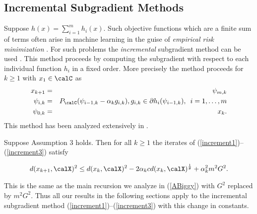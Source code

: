  \subsection{Incremental Subgradient Methods}
 Suppose $h(x)=\sum_{i=1}^m h_i(x)$. Such objective functions which are a finite sum of terms often arise in machine learning in the guise of \emph{empirical risk minimization} \cite{hastie2009elements}. For such problems the \emph{incremental} subgradient method can be used \cite{nedic2001convergence}. This method proceeds by computing the subgradient with respect to each individual function $h_i$ in a fixed order. More precisely the method proceeds for $k\geq 1$ with $x_1\in\calC$ as
 \begin{eqnarray}\label{increment1}
 x_{k+1}&=&\psi_{m,k}
 \\\label{increment2}
 \psi_{i,k}&=& P_\calC(\psi_{i-1,k}-\alpha_k g_{i,k}),g_{i,k}\in\partial h_i(\psi_{i-1,k}),\,\,\, i=1,\ldots,m
 \\\label{increment3}
 \psi_{0,k}&=&x_k.
 \end{eqnarray}
  This method has been analyzed extensively in \cite{nedic2001convergence}.
  \begin{proposition}
Suppose Assumption 3 holds. Then for all $k\geq 1$ the iterates of (\ref{increment1})--(\ref{increment3}) satisfy
  \end{proposition}
 \begin{eqnarray*}
 d(x_{k+1},\calX)^2
 \leq
  d(x_{k},\calX)^2
  - 2\alpha_k c d(x_k,\calX)^{\frac{1}{\theta}}
  +
  \alpha_k^2 m^2 G^2.
 \end{eqnarray*}
 
This is the same as the main recursion we analyze in (\ref{ABiggy}) with $G^2$ replaced by $m^2 G^2$. Thus all our results in the following sections apply to the incremental subgradient method (\ref{increment1})--(\ref{increment3}) with this change in constants. 

